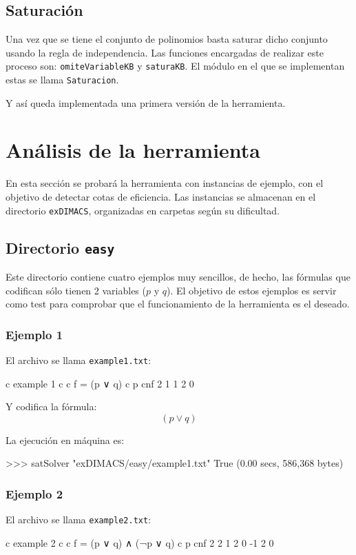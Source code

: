 \subsection{Saturación}

Una vez que se tiene el conjunto de polinomios basta saturar dicho conjunto usando la regla de independencia. Las funciones encargadas de realizar este proceso son: \texttt{omiteVariableKB} y \texttt{saturaKB}. El módulo en el que se implementan estas se llama \texttt{Saturacion}.


Y así queda implementada una primera versión de la herramienta.

\newpage
\section{Análisis de la herramienta}

En esta sección se probará la herramienta con instancias de ejemplo, con el objetivo de detectar cotas de eficiencia. Las instancias se almacenan en el directorio \texttt{exDIMACS}, organizadas en carpetas según su dificultad.

\subsection{Directorio \texttt{easy}}
Este directorio contiene cuatro ejemplos muy sencillos, de hecho, las fórmulas que codifican sólo  tienen 2 variables ($p$ y $q$). El objetivo de estos ejemplos es servir como test para comprobar que el funcionamiento de la herramienta es el deseado.

\subsubsection{Ejemplo 1}

El archivo se llama \texttt{example1.txt}:
\begin{codigo}
c example 1 
c 
c f = (p ∨ q)
c
p cnf 2 1 
1 2 0
\end{codigo}

Y codifica la fórmula:
$$(p \vee q)$$

La ejecución en máquina es:
\begin{code}
>>> satSolver "exDIMACS/easy/example1.txt"
True
(0.00 secs, 586,368 bytes)
\end{code}
\subsubsection{Ejemplo 2}
El archivo se llama \texttt{example2.txt}:
\begin{codigo}
c example 2
c 
c f = (p ∨ q) ∧ (¬p ∨ q)
c
p cnf 2 2
1 2 0
-1 2 0
\end{codigo}


